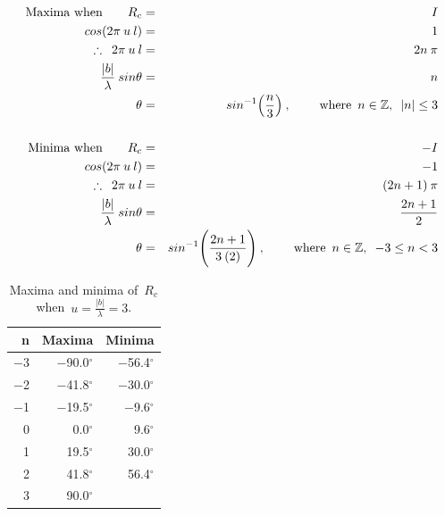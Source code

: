 \documentclass[11pt, a4paper]{article}
\newcommand{\msp}{\mkern \medmuskip}
\begin{document}
\begin{eqnarray}
  \label{eq:8}
            \mbox{Maxima when} \qquad R_c &=& I           \nonumber \\
                  cos(2\pi \msp u \msp l) &=& 1           \nonumber \\
  \therefore \enspace 2\pi \msp u \msp l  &=& 2n \msp \pi \nonumber \\
       \frac{|b|}{\lambda} \msp sin\theta &=& n           \nonumber \\
                                   \theta &=& sin^{-1}\Big(\frac{n}{3}\Big) \msp , \hspace{0.8cm} \mbox{where} \enspace n \in \mathbb{Z}, \enspace |n| \leq 3 \nonumber \\
                                                 \nonumber \\
            \mbox{Minima when} \qquad R_c &=& -I \nonumber \\
                  cos(2\pi \msp u \msp l) &=& -1 \nonumber \\
   \therefore \enspace 2\pi \msp u \msp l &=& (2n+1) \msp \pi \nonumber \\
       \frac{|b|}{\lambda} \msp sin\theta &=& \frac{2n+1}{2} \nonumber \\
                                   \theta &=& sin^{-1}\Bigg(\frac{2n+1}{3 \msp (2)}\Bigg) \msp , \hspace{0.8cm} \mbox{where} \enspace n \in \mathbb{Z}, \enspace -3 \leq n < 3 \nonumber
\end{eqnarray}

\begin{table}
  \centering
\begin{tabular}{rrr}
  n & Maxima         & Minima         \\
  \hline
  $-$3 & $-$90.0$^\circ$ & $-$56.4$^\circ$ \\
  $-$2 & $-$41.8$^\circ$ & $-$30.0$^\circ$ \\
  $-$1 & $-$19.5$^\circ$ &  $-$9.6$^\circ$ \\
     0 &     0.0$^\circ$ &     9.6$^\circ$ \\
     1 &    19.5$^\circ$ &    30.0$^\circ$ \\
     2 &    41.8$^\circ$ &    56.4$^\circ$ \\
     3 &    90.0$^\circ$ &                \\
  \hline
\end{tabular}
\caption[]{Maxima and minima of~$R_c$ when~$u = \frac{|b|}{\lambda} = 3$.}
\label{tab:max-min}
\end{table}
\end{document}
